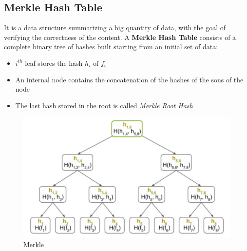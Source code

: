 \subsection{Merkle Hash Table}
\begin{paracol}{2}
   It is a data structure summarizing a big quantity of data, with the goal of verifying the correctness of the content.
   A \textbf{Merkle Hash Table} consists of a complete binary tree of hashes built starting from an initial set of data:
   \begin{itemize}
      \item $i^{th}$ leaf stores the hash $h_i$ of $f_i$ 
      \item An internal node contains the concatenation of the hashes of the sons of the node
      \item The last hash stored in the root is called \textit{Merkle Root Hash}
   \end{itemize}
   
\switchcolumn

\begin{figure}[htbp]
   \centering
   \includegraphics{images/merkle.png}
   \caption{Merkle}
   \label{fig:merkle}
\end{figure}
\end{paracol}

